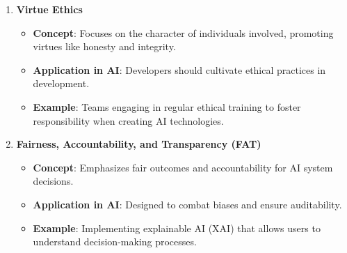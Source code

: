 \documentclass{beamer}
\begin{document}
\begin{frame}[fragile]
\begin{enumerate}
        \item \textbf{Virtue Ethics}
            \begin{itemize}
                \item \textbf{Concept}: Focuses on the character of individuals involved, promoting virtues like honesty and integrity.
                \item \textbf{Application in AI}: Developers should cultivate ethical practices in development.
                \item \textbf{Example}: Teams engaging in regular ethical training to foster responsibility when creating AI technologies.
            \end{itemize}
        
        \item \textbf{Fairness, Accountability, and Transparency (FAT)}
            \begin{itemize}
                \item \textbf{Concept}: Emphasizes fair outcomes and accountability for AI system decisions.
                \item \textbf{Application in AI}: Designed to combat biases and ensure auditability.
                \item \textbf{Example}: Implementing explainable AI (XAI) that allows users to understand decision-making processes.
            \end{itemize}
    \end{enumerate}
\end{frame}
\end{document}
